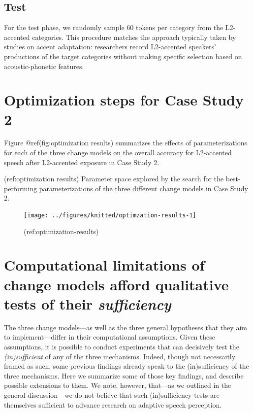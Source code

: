 \documentclass[
  11pt,
  english,
  man,floatsintext]{apa6}
\begin{document}
\hypertarget{test-1}{%
\subsection{Test}\label{test-1}}

For the test phase, we randomly sample 60 tokens per category from the L2-accented categories. This procedure matches the approach typically taken by studies on accent adaptation: researchers record L2-accented speakers' productions of the target categories without making specific selection based on acoustic-phonetic features.

\hypertarget{optimization-steps-for-case-study-2}{%
\section{Optimization steps for Case Study 2}\label{optimization-steps-for-case-study-2}}

Figure @ref(fig:optimization results) summarizes the effects of parameterizations for each of the three change models on the overall accuracy for L2-accented speech after L2-accented exposure in Case Study 2.

(ref:optimization results) Parameter space explored by the search for the best-performing parameterizations of the three different change models in Case Study 2.

\begin{figure}

{\centering \texttt{[image: ../figures/knitted/optimzation-results-1]} 

}

\caption{(ref:optimization-results)}\label{fig:optimzation-results}
\end{figure}

\hypertarget{sec:sufficiency}{%
\section{\texorpdfstring{Computational limitations of change models afford qualitative tests of their \emph{sufficiency}}{Computational limitations of change models afford qualitative tests of their sufficiency}}\label{sec:sufficiency}}

The three change models---as well as the three general hypotheses that they aim to implement---differ in their computational assumptions. Given these assumptions, it is possible to conduct experiments that can decisively test the \emph{(in)sufficient} of any of the three mechanisms. Indeed, though not necessarily framed as such, some previous findings already speak to the (in)sufficiency of the three mechanisms. Here we summarize some of those key findings, and describe possible extensions to them. We note, however, that---as we outlined in the general discussion---we do not believe that such (in)sufficiency tests are themselves sufficient to advance research on adaptive speech perception.
\end{document}
